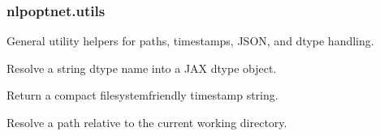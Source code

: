 \documentclass[letterpaper,10pt,english,openany,oneside]{sphinxmanual}
\begin{document}
\sphinxstepscope


\subsubsection{nlpoptnet.utils}
\label{\detokenize{api/core/nlpoptnet/utils:module-nlpoptnet.utils}}\label{\detokenize{api/core/nlpoptnet/utils:nlpoptnet-utils}}\label{\detokenize{api/core/nlpoptnet/utils::doc}}
\sphinxAtStartPar
General utility helpers for paths, timestamps, JSON, and dtype handling.

\begin{fulllineitems}
\label{\detokenize{api/core/nlpoptnet/utils:nlpoptnet.utils.resolve_dtype}}
\pysigstartsignatures
{}
\pysigstopsignatures
\sphinxAtStartPar
Resolve a string dtype name into a JAX dtype object.

\end{fulllineitems}


\begin{fulllineitems}
\label{\detokenize{api/core/nlpoptnet/utils:nlpoptnet.utils.timestamp}}
\pysigstartsignatures
{}
\pysigstopsignatures
\sphinxAtStartPar
Return a compact filesystem\sphinxhyphen{}friendly timestamp string.

\end{fulllineitems}


\begin{fulllineitems}
\label{\detokenize{api/core/nlpoptnet/utils:nlpoptnet.utils.resolve_path}}
\pysigstartsignatures
{}
\pysigstopsignatures
\sphinxAtStartPar
Resolve a path relative to the current working directory.

\end{fulllineitems}
\end{document}
